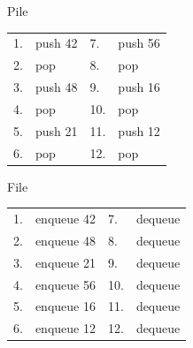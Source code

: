 \documentclass[11pt,a4paper]{article}
\begin{document}
\begin{center}

\begin{table}[ht!]
  \centering
  \begin{minipage}{0.45\textwidth}
    \centering
Pile

\bigskip

\begin{tabular}{l l | l l}
1. & push 42   & 7. & push 56 \\
2. & pop       & 8. & pop     \\
3. & push 48   & 9. & push 16 \\
4. & pop       & 10. & pop     \\
5. & push 21   & 11. & push 12 \\
6. & pop       & 12. & pop     \\
\end{tabular}

  \end{minipage}
  \hfillx
  \begin{minipage}{0.01\textwidth}


  \end{minipage}
  \hfillx
  \begin{minipage}{0.45\textwidth}
    \centering
File

\bigskip

\begin{tabular}{l l | l l}
1. & enqueue 42  & 7. & dequeue \\
2. & enqueue 48  & 8. & dequeue \\
3. & enqueue 21  & 9. & dequeue \\
4. & enqueue 56  & 10. & dequeue \\
5. & enqueue 16  & 11. & dequeue \\
6. & enqueue 12  & 12. & dequeue \\
\end{tabular}

  \end{minipage}
\end{table}

\end{center}
\end{document}
